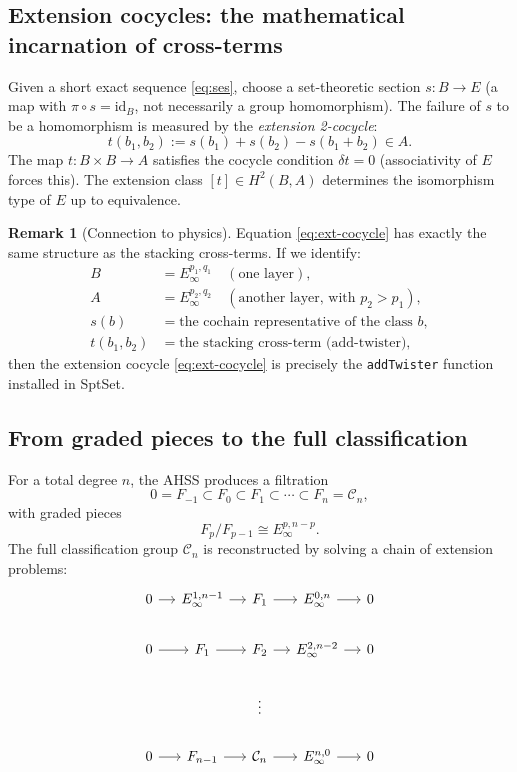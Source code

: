 \documentclass{SciPost}
\theoremstyle{definition}
\newtheorem{remark}[theorem]{Remark}
\begin{document}
\subsection{Extension cocycles: the mathematical incarnation of cross-terms}
\label{subsec:extension-cocycles}

Given a short exact sequence \eqref{eq:ses}, choose a set-theoretic section $s: B \to E$ (a map with $\pi \circ s = \mathrm{id}_B$, not necessarily a group homomorphism).
The failure of $s$ to be a homomorphism is measured by the \emph{extension 2-cocycle}:
\begin{equation}
\label{eq:ext-cocycle}
t(b_1, b_2) := s(b_1) + s(b_2) - s(b_1 + b_2) \in A.
\end{equation}
The map $t: B \times B \to A$ satisfies the cocycle condition $\delta t = 0$ (associativity of $E$ forces this).
The extension class $[t] \in H^2(B, A)$ determines the isomorphism type of $E$ up to equivalence.

\begin{remark}[Connection to physics]
Equation \eqref{eq:ext-cocycle} has exactly the same structure as the stacking cross-terms.
If we identify:
\begin{align*}
B &= E_\infty^{p_1, q_1} \quad (\text{one layer}), \\
A &= E_\infty^{p_2, q_2} \quad (\text{another layer, with } p_2 > p_1), \\
s(b) &= \text{the cochain representative of the class } b, \\
t(b_1, b_2) &= \text{the stacking cross-term (add-twister)},
\end{align*}
then the extension cocycle \eqref{eq:ext-cocycle} is precisely the \texttt{addTwister} function installed in SptSet.
\end{remark}

\subsection{From graded pieces to the full classification}
\label{subsec:graded-to-full}

For a total degree $n$, the AHSS produces a filtration
\begin{equation}
0 = F_{-1} \subset F_0 \subset F_1 \subset \cdots \subset F_n = \mathcal{C}_n,
\end{equation}
with graded pieces
\begin{equation}
F_p / F_{p-1} \cong E_\infty^{p, n-p}.
\end{equation}
The full classification group $\mathcal{C}_n$ is reconstructed by solving a chain of extension problems:
\begin{equation}
\label{eq:extension-chain}
\begin{tikzcd}[column sep=small]
0 \ar[r] & E_\infty^{1, n-1} \ar[r] & F_1 \ar[r] & E_\infty^{0, n} \ar[r] & 0 \\
0 \ar[r] & F_1 \ar[r] & F_2 \ar[r] & E_\infty^{2, n-2} \ar[r] & 0 \\
& & \vdots & & \\
0 \ar[r] & F_{n-1} \ar[r] & \mathcal{C}_n \ar[r] & E_\infty^{n, 0} \ar[r] & 0
\end{tikzcd}
\end{equation}
\end{document}

